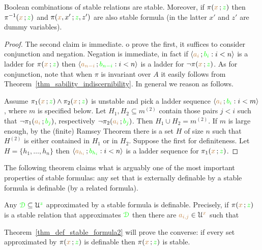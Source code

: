 \begin{lemma}\label{lem_stab_Boole}
  Boolean combinations of stable relations are stable.
  Moreover, if $\pi({\color{brown} x}\,;{\color{green} z})$ then  $\pi^{-1}({\color{brown} x}\,;{\color{green} z})$ and $\pi({\color{brown} x},x'\,;{\color{green} z},z')$ are also stable formula (in the latter $x'$ and $z'$ are dummy variables).
\end{lemma}

\begin{proof}
  The second claim is immediate.
  o prove the first, it suffices to consider conjunction and negation.
  Negation is immediate, in fact if $\langle{\color{brown}a_i}\,;{\color{green} b_i} : i<n\rangle$ is a ladder for $\pi({\color{brown} x}\,;{\color{green} z})$ then $\langle{\color{brown}a_{n-i}}\,;{\color{green} b_{n-i}} : i<n\rangle$ is a ladder for $\neg\pi({\color{brown} x}\,;{\color{green} z})$.
  As for conjunction, note that when $\pi$ is invariant over $A$ it easily follows from Theorem~\ref{thm_sability_indiscernibility}.
  In general we reason as follows.

  Assume $\pi_1({\color{brown} x}\,;{\color{green} z})\wedge\pi_2({\color{brown} x}\,;{\color{green} z})$ is unstable and pick a ladder sequence $\langle{\color{brown}a_i}\,;{\color{green} b_i} : i<m\rangle$, where $m$ is specified below.
  Let $H_1,H_2\subseteq m^{(2)}$ contain those pairs $j<i$ such that $\neg\pi_1({\color{brown} a_i}\,;{\color{green} b_j})$, respectively $\neg\pi_2({\color{brown} a_i}\,;{\color{green} b_j})$. 
  Then $H_1\cup H_2= m^{(2)}$. 
  If $m$ is large enough, by the (finite) Ramsey Theorem there is a set $H$ of size $n$ such that $H^{(2)}$ is either contained in $H_1$ or in $H_2$. Suppose the first for definiteness. 
  Let $H=\{h_1,\dots,h_n\}$ then $\langle{\color{brown}a_{h_i}}\,;{\color{green} b_{h_i}} : i<n\rangle$ is a ladder sequence for $\pi_1({\color{brown} x}\,;{\color{green} z})$.
\end{proof}

The following theorem claims what is arguably one of the most important properties of stable formulas: any set that is externally definable by a stable formula is definable (by a related formula).

\begin{theorem}\label{thm_def_stable_formula}
Any ${\color{green}\EuScript D}\subseteq\EuScript U^{\color{green} z}$ approximated by a stable formula is definable.
Precisely, if $\pi({\color{brown} x}\,;{\color{green} z})$ is a stable relation that approximates ${\color{green}\EuScript D}$ then there are ${\color{brown} a_{i,j}}\in\EuScript U^{\color{brown} x}$ such that

\end{theorem}

Theorem~\ref{thm_def_stable_formula2} will prove the converse: if every set approximated by $\pi({\color{brown} x}\,;{\color{green} z})$ is definable then $\pi({\color{brown} x}\,;{\color{green} z})$ is stable.

